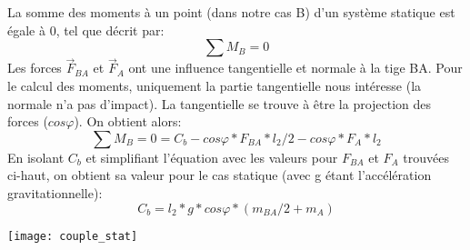 \documentclass{udes_rapport} %
\begin{document}
La somme des moments à un point (dans notre cas B) d'un système statique est égale à 0, tel que décrit par:
\begin{equation}
	\sum M_B =  0
\end{equation}
Les forces $\overrightarrow F_{BA}$ et $\overrightarrow F_A$ ont une influence tangentielle et normale à la tige BA. Pour le calcul des moments, uniquement la partie tangentielle nous intéresse (la normale n'a pas d'impact). La tangentielle se trouve à être la projection des forces ($cos\varphi$). On obtient alors:
	\[	\sum M_B =  0 = C_b - cos\varphi*F_{BA}*l_2/2 - cos\varphi*F_A*l_2	\]
En isolant $C_b$ et simplifiant l'équation avec les valeurs pour $F_{BA}$ et $F_A$ trouvées ci-haut, on obtient sa valeur pour le cas statique (avec g étant l'accélération gravitationnelle):
	\[	C_b = l_2*g*cos\varphi*(m_{BA}/2+m_A)	\]
\begin{center}
	\centering
	\texttt{[image: couple\_stat]}
	\label{couple_statique}
\end{center}
\end{document}
